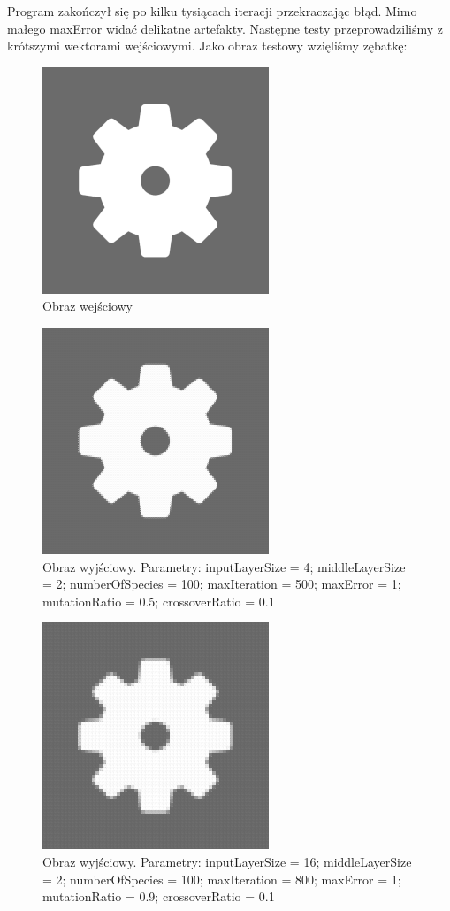 \documentclass[12pt,a4paper,oneside]{article}
\begin{document}
Program zakończył się po kilku tysiącach iteracji przekraczając błąd. Mimo małego maxError widać delikatne artefakty. Następne testy przeprowadziliśmy z krótszymi wektorami wejściowymi. Jako obraz testowy wzięliśmy zębatkę:

\begin{figure}[H]
\centering
\includegraphics[width=.4\textwidth]{cog}
\caption{Obraz wejściowy}
\end{figure}

\begin{figure}[H]
\centering
\includegraphics[width=.4\textwidth]{cog4}
\caption{Obraz wyjściowy. Parametry: inputLayerSize = 4; middleLayerSize = 2; numberOfSpecies = 100; maxIteration = 500; maxError = 1; mutationRatio = 0.5; crossoverRatio = 0.1}
\end{figure}

\begin{figure}[H]
\centering
\includegraphics[width=.4\textwidth]{cog16}
\caption{Obraz wyjściowy. Parametry: inputLayerSize = 16; middleLayerSize = 2; numberOfSpecies = 100; maxIteration = 800; maxError = 1; mutationRatio = 0.9; crossoverRatio = 0.1}
\end{figure}
\end{document}
